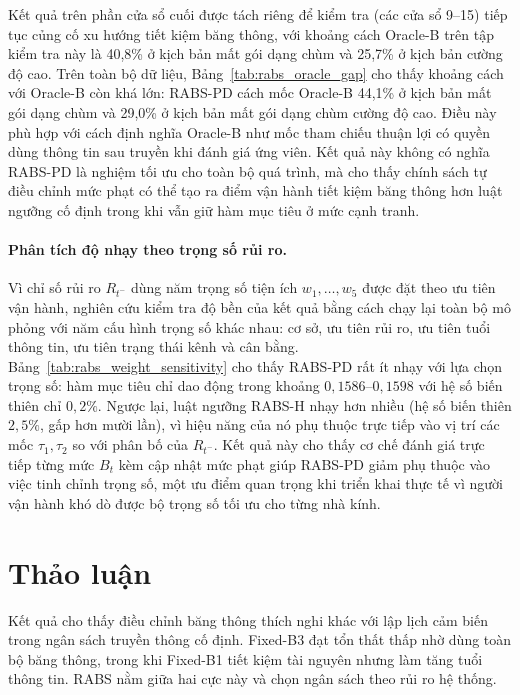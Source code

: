 \documentclass[10pt]{article}
\begin{document}
Kết quả trên phần cửa sổ cuối được tách riêng để kiểm tra (các cửa sổ 9--15) tiếp tục củng cố xu hướng tiết kiệm băng thông, với khoảng cách Oracle-B trên tập kiểm tra này là 40,8\% ở kịch bản mất gói dạng chùm và 25,7\% ở kịch bản cường độ cao. Trên toàn bộ dữ liệu, Bảng~\ref{tab:rabs_oracle_gap} cho thấy khoảng cách với Oracle-B còn khá lớn: RABS-PD cách mốc Oracle-B 44,1\% ở kịch bản mất gói dạng chùm và 29,0\% ở kịch bản mất gói dạng chùm cường độ cao. Điều này phù hợp với cách định nghĩa Oracle-B như mốc tham chiếu thuận lợi có quyền dùng thông tin sau truyền khi đánh giá ứng viên. Kết quả này không có nghĩa RABS-PD là nghiệm tối ưu cho toàn bộ quá trình, mà cho thấy chính sách tự điều chỉnh mức phạt có thể tạo ra điểm vận hành tiết kiệm băng thông hơn luật ngưỡng cố định trong khi vẫn giữ hàm mục tiêu ở mức cạnh tranh.

\paragraph{Phân tích độ nhạy theo trọng số rủi ro.}
Vì chỉ số rủi ro $R_{t^-}$ dùng năm trọng số tiện ích $w_1,\ldots,w_5$ được đặt theo ưu tiên vận hành, nghiên cứu kiểm tra độ bền của kết quả bằng cách chạy lại toàn bộ mô phỏng với năm cấu hình trọng số khác nhau: cơ sở, ưu tiên rủi ro, ưu tiên tuổi thông tin, ưu tiên trạng thái kênh và cân bằng. Bảng~\ref{tab:rabs_weight_sensitivity} cho thấy RABS-PD rất ít nhạy với lựa chọn trọng số: hàm mục tiêu chỉ dao động trong khoảng $0{,}1586$--$0{,}1598$ với hệ số biến thiên chỉ $0{,}2\%$. Ngược lại, luật ngưỡng RABS-H nhạy hơn nhiều (hệ số biến thiên $2{,}5\%$, gấp hơn mười lần), vì hiệu năng của nó phụ thuộc trực tiếp vào vị trí các mốc $\tau_1,\tau_2$ so với phân bố của $R_{t^-}$. Kết quả này cho thấy cơ chế đánh giá trực tiếp từng mức $B_t$ kèm cập nhật mức phạt giúp RABS-PD giảm phụ thuộc vào việc tinh chỉnh trọng số, một ưu điểm quan trọng khi triển khai thực tế vì người vận hành khó dò được bộ trọng số tối ưu cho từng nhà kính.

\begin{table}[ht]
\centering
\caption{Độ nhạy của hàm mục tiêu theo năm cấu hình trọng số rủi ro. Hệ số biến thiên (CV) càng nhỏ thể hiện chính sách càng ít phụ thuộc vào tinh chỉnh trọng số.}
\label{tab:rabs_weight_sensitivity}
\resizebox{\linewidth}{!}{}
\end{table}

\section{Thảo luận}
Kết quả cho thấy điều chỉnh băng thông thích nghi khác với lập lịch cảm biến trong ngân sách truyền thông cố định. Fixed-B3 đạt tổn thất thấp nhờ dùng toàn bộ băng thông, trong khi Fixed-B1 tiết kiệm tài nguyên nhưng làm tăng tuổi thông tin. RABS nằm giữa hai cực này và chọn ngân sách theo rủi ro hệ thống.
\end{document}
